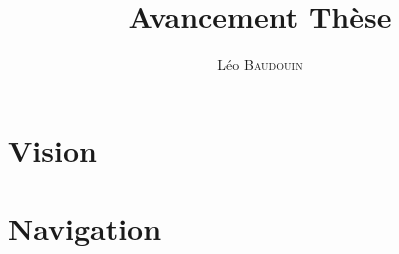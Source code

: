 \documentclass[10pt]{article}
\author{Léo \textsc{Baudouin}}
\title{Avancement Thèse}
\begin{document}
\maketitle

\section{Vision}



\section{Navigation}
\end{document}
